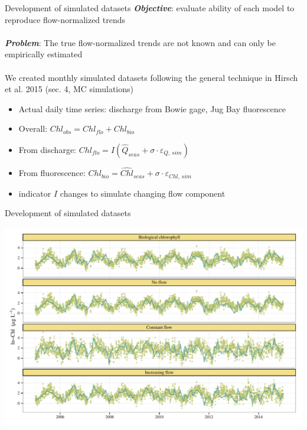 \documentclass[serif]{beamer}\usepackage[]{graphicx}\usepackage[]{color}
\makeatletter
\def\maxwidth{ %
  \ifdim\Gin@nat@width>\linewidth
    \linewidth
  \else
    \Gin@nat@width
  \fi
}
\newenvironment{knitrout}{}{} %
\newcommand{\Bigtxt}[1]{\textbf{\textit{#1}}}
\makeatother
\begin{document}
\begin{frame}{Development of simulated datasets}
\Bigtxt{Objective}: evaluate ability of each model to reproduce flow-normalized trends\\~\\
\Bigtxt{Problem}: The true flow-normalized trends are not known and can only be empirically estimated \\~\\
We created monthly simulated datasets following the general technique in Hirsch et al. 2015 (sec. 4, MC simulations) \\
\begin{itemize}
\item Actual daily time series: discharge from Bowie gage, Jug Bay fluorescence
\item Overall: $Chl_{obs} = Chl_{flo} + Chl_{bio}$
\item From discharge: $Chl_{flo} = I\left(\widehat{Q}_{seas} + \sigma\cdot\varepsilon_{Q,\,sim}\right)$
\item From fluorescence: $Chl_{bio} = \widehat{Chl}_{seas} + \sigma\cdot\varepsilon_{Chl,\,sim}$
\item indicator $I$ changes to simulate changing flow component
\end{itemize}
\end{frame}

\begin{frame}[fragile]{Development of simulated datasets}
\begin{knitrout}
\color{fgcolor}

{\centering \includegraphics[width=\maxwidth]{figs/unnamed-chunk-2-1} 

}



\end{knitrout}
\end{frame}
\end{document}
